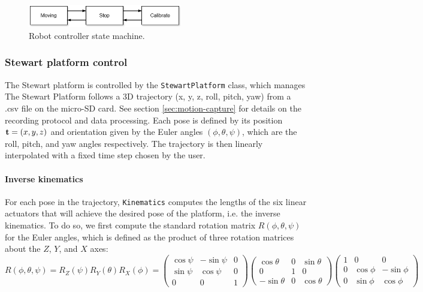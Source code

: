 \begin{figure}[H]
\centering
\includegraphics[width=0.6\textwidth]{figures/state_machine.drawio.png}
\caption{Robot controller state machine.}
\label{fig:state_machine}
\end{figure}

\subsubsection{Stewart platform control}

The Stewart platform is controlled by the \texttt{StewartPlatform} class, which manages 
The Stewart Platform follows a 3D trajectory (x, y, z, roll, pitch, yaw) from a .csv file on the micro-SD card.
See section \ref{sec:motion-capture} for details on the recording protocol and data processing.
Each pose is defined by its position ${\bf t}=(x,y,z)$ and orientation given by the Euler angles $(\phi,\theta,\psi)$,
 which are the roll, pitch, and yaw angles respectively.
The trajectory is then linearly interpolated with a fixed time step chosen by the user.

\paragraph{Inverse kinematics}
For each pose in the trajectory, \texttt{Kinematics} computes the lengths of the six linear actuators that will achieve 
the desired pose of the platform, i.e. the inverse kinematics. To do so, we first compute the standard rotation matrix 
$R(\phi,\theta,\psi)$ for the Euler angles, which is defined as the product of three rotation matrices about 
the $Z$, $Y$, and $X$ axes:
\[
R(\phi,\theta,\psi) = R_Z(\psi) R_Y(\theta) R_X(\phi) =
\begin{pmatrix}
\cos\psi & -\sin\psi & 0 \\
\sin\psi & \cos\psi & 0 \\
0 & 0 & 1
\end{pmatrix}
\begin{pmatrix}
\cos\theta & 0 & \sin\theta \\
0 & 1 & 0 \\
-\sin\theta & 0 & \cos\theta
\end{pmatrix}
\begin{pmatrix}
1 & 0 & 0 \\
0 & \cos\phi & -\sin\phi \\
0 & \sin\phi & \cos\phi
\end{pmatrix}
\]

